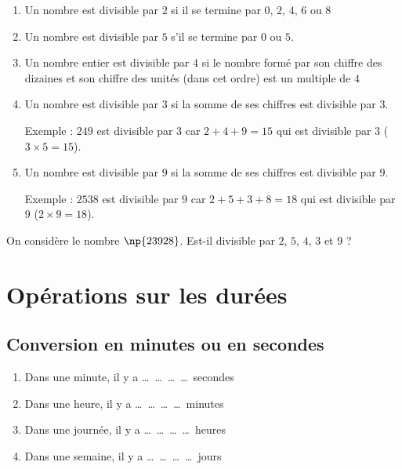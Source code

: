\documentclass[a4paper,10pt]{report}
\begin{document}
\begin{prop}
\begin{enumerate}
\item[•] Un nombre est divisible par $2$ si il se termine par $0$, $2$, $4$, $6$ ou $8$\medskip
\item[•] Un nombre est divisible par $5$ s'il se termine par $0$ ou $5$.\medskip

\item[•] Un nombre entier est divisible par $4$ si le nombre formé par son chiffre des dizaines et son chiffre des unités (dans cet ordre) est un multiple de $4$\medskip

\item[•] Un nombre est divisible par $3$ si la somme de ses chiffres est divisible par $3$.\medskip

Exemple : $249$ est divisible par $3$ car $2 + 4 + 9 = 15$ qui est divisible par $3$ ($3 \times 5 = 15$).\medskip

\item[•] Un nombre est divisible par $9$ si la somme de ses chiffres est divisible par $9$.

Exemple : $2 538$ est divisible par $9$ car $2 + 5 + 3 + 8 = 18$ qui est divisible par $9$ ($2 \times 9 = 18$).
\end{enumerate}
\end{prop}

\begin{ex}
On considère le nombre $\np{23 928}$. Est-il divisible par $2$, $5$, $4$, $3$ et $9$ ?

\noindent\grandscarreaux{\linewidth}{5.6cm}
\end{ex} 

\section{Opérations sur les durées}

\subsection{Conversion en minutes ou en secondes}

\begin{prop}
\begin{enumerate}
\item[•] Dans une minute, il y a \dots ~\dots ~\dots ~\dots ~secondes\medskip
\item[•] Dans une heure, il y a \dots ~\dots ~\dots ~\dots ~minutes\medskip
\item[•] Dans une journée, il y a \dots ~\dots ~\dots ~\dots ~heures\medskip
\item[•] Dans une semaine, il y a \dots ~\dots ~\dots ~\dots ~jours
\end{enumerate}
\end{prop}
\end{document}
